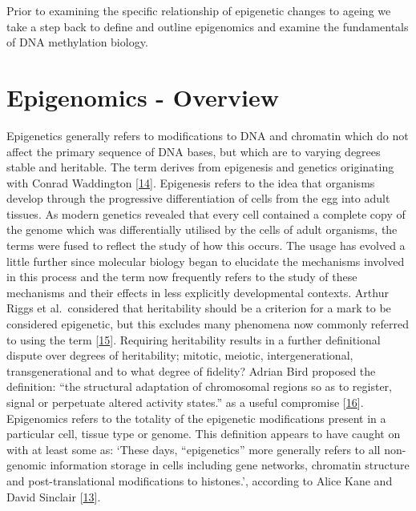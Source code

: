 \documentclass[
]{book}
\begin{document}
Prior to examining the specific relationship of epigenetic changes to ageing we take a step back to define and outline epigenomics and examine the fundamentals of DNA methylation biology.

\hypertarget{epigenomics---overview}{%
\section{Epigenomics - Overview}\label{epigenomics---overview}}

Epigenetics generally refers to modifications to DNA and chromatin which do not affect the primary sequence of DNA bases, but which are to varying degrees stable and heritable.
The term derives from epigenesis and genetics originating with Conrad Waddington {[}\protect\hyperlink{ref-Waddington1942}{14}{]}.
Epigenesis refers to the idea that organisms develop through the progressive differentiation of cells from the egg into adult tissues.
As modern genetics revealed that every cell contained a complete copy of the genome which was differentially utilised by the cells of adult organisms, the terms were fused to reflect the study of how this occurs.
The usage has evolved a little further since molecular biology began to elucidate the mechanisms involved in this process and the term now frequently refers to the study of these mechanisms and their effects in less explicitly developmental contexts.
Arthur Riggs et al.~considered that heritability should be a criterion for a mark to be considered epigenetic, but this excludes many phenomena now commonly referred to using the term {[}\protect\hyperlink{ref-Russo1996}{15}{]}.
Requiring heritability results in a further definitional dispute over degrees of heritability; mitotic, meiotic, intergenerational, transgenerational and to what degree of fidelity?
Adrian Bird proposed the definition: ``the structural adaptation of chromosomal regions so as to register, signal or perpetuate altered activity states.'' as a useful compromise {[}\protect\hyperlink{ref-Bird2007}{16}{]}.
Epigenomics refers to the totality of the epigenetic modifications present in a particular cell, tissue type or genome.
This definition appears to have caught on with at least some as: `These days, ``epigenetics'' more generally refers to all non-genomic information storage in cells including gene networks, chromatin structure and post-translational modifications to histones.', according to Alice Kane and David Sinclair {[}\protect\hyperlink{ref-Kane2019}{13}{]}.
\end{document}
